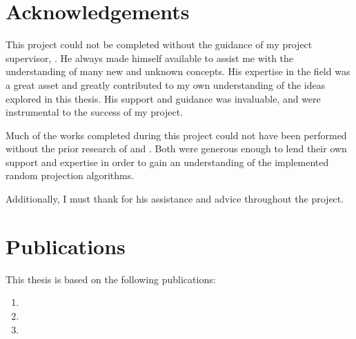 \documentclass[a4paper]{report}
\begin{document}

\chapter*{Acknowledgements}
This project could not be completed without the guidance of my project 
supervisor, . He always made himself available to assist me
with the understanding of many new and unknown concepts. His expertise in the 
field was a great asset and greatly contributed to my own understanding of the 
ideas explored in this thesis. His support and guidance was invaluable, and were
instrumental to the success of my project. 

Much of the works completed during this project could not have been performed 
without the prior research of  and . Both were
generous enough to lend their own support and expertise in order to gain an 
understanding of the implemented random projection algorithms.

Additionally, I must thank  for his assistance and advice 
throughout the project.

\chapter*{Publications}
This thesis is based on the following publications:
\begin{enumerate}
\item {}
\item {}
\item {}
\end{enumerate}
\end{document}
